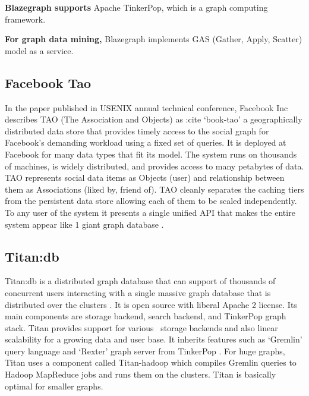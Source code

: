 {     {\bf Blazegraph supports} Apache TinkerPop, which is a graph
      computing framework.

     {\bf For graph data mining,} Blazegraph implements GAS (Gather, Apply, 
     Scatter) model as a service.

     \pv

\subsection{Facebook Tao}

     In the paper published in USENIX annual technical conference,
     Facebook Inc describes TAO (The Association and Objects) as :cite
     ‘book-tao’ a geographically distributed data store that provides
     timely access to the social graph for Facebook’s demanding
     workload using a fixed set of queries. It is deployed at Facebook
     for many data types that fit its model. The system runs on
     thousands of machines, is widely distributed, and provides access
     to many petabytes of data. TAO represents social data items as
     Objects (user) and relationship between them as Associations
     (liked by, friend of).  TAO cleanly separates the caching tiers
     from the persistent data store allowing each of them to be scaled
     independently. To any user of the system it presents a single
     unified API that makes the entire system appear like 1 giant
     graph database \cite{www-tao}.

     \pv

\subsection{Titan:db}

     Titan:db is a distributed graph database that
     can support of thousands of concurrent users interacting with a
     single massive graph database that is distributed over the
     clusters \cite{www-Titan}. It is open source with liberal
     Apache 2 license. Its
     main components are storage backend, search backend, and
     TinkerPop graph stack. Titan provides support for various 
     storage backends and also linear scalability for a growing data
     and user base. It inherits features such as ‘Gremlin’ query
     language and ‘Rexter’ graph server from TinkerPop
     \cite{www-TinkerPop}.  For huge graphs, Titan uses a component
     called Titan-hadoop which compiles Gremlin queries to Hadoop
     MapReduce jobs and runs them on the clusters. Titan is basically
     optimal for smaller graphs.

}
